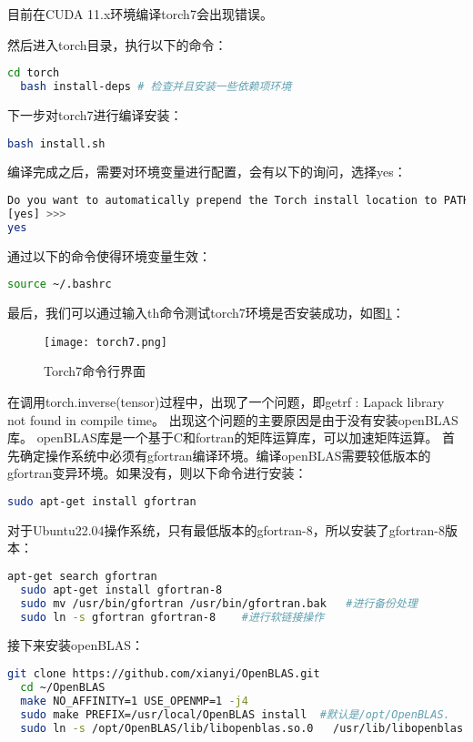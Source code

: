 \documentclass[lang=cn,a4paper,newtx]{elegantpaper}
\begin{document}
目前在CUDA 11.x环境编译torch7会出现错误。

然后进入torch目录，执行以下的命令：
\begin{lstlisting}[language=bash]
  cd torch
  bash install-deps # 检查并且安装一些依赖项环境
\end{lstlisting}

下一步对torch7进行编译安装：
\begin{lstlisting}[language=bash]
  bash install.sh
\end{lstlisting}

编译完成之后，需要对环境变量进行配置，会有以下的询问，选择yes：
\begin{lstlisting}[language=bash]
Do you want to automatically prepend the Torch install location to PATH and LD_LIBRARY in your /home/asus/.bashrc?(yes/no)
[yes] >>>
yes
\end{lstlisting}

通过以下的命令使得环境变量生效：
\begin{lstlisting}[language=bash]
  source ~/.bashrc
\end{lstlisting}

最后，我们可以通过输入th命令测试torch7环境是否安装成功，如图\ref{fig:torch7_terminal}：
\begin{figure}[hbpt]
  \centering
  \texttt{[image: torch7.png]}
  \caption{Torch7命令行界面}
  \label{fig:torch7_terminal}
\end{figure}

在调用torch.inverse(tensor)过程中，出现了一个问题，即getrf : Lapack library not found in compile time。
出现这个问题的主要原因是由于没有安装openBLAS库。
openBLAS库是一个基于C和fortran的矩阵运算库，可以加速矩阵运算。
首先确定操作系统中必须有gfortran编译环境。编译openBLAS需要较低版本的gfortran变异环境。如果没有，则以下命令进行安装：
\begin{lstlisting}[language=bash]
  sudo apt-get install gfortran
\end{lstlisting}

对于Ubuntu22.04操作系统，只有最低版本的gfortran-8，所以安装了gfortran-8版本：
\begin{lstlisting}[language=bash]
  apt-get search gfortran
  sudo apt-get install gfortran-8
  sudo mv /usr/bin/gfortran /usr/bin/gfortran.bak	#进行备份处理
  sudo ln -s gfortran gfortran-8	#进行软链接操作 
\end{lstlisting}

接下来安装openBLAS：

\begin{lstlisting}[language=bash]
  git clone https://github.com/xianyi/OpenBLAS.git
  cd ~/OpenBLAS
  make NO_AFFINITY=1 USE_OPENMP=1 -j4
  sudo make PREFIX=/usr/local/OpenBLAS install  #默认是/opt/OpenBLAS.
  sudo ln -s /opt/OpenBLAS/lib/libopenblas.so.0   /usr/lib/libopenblas.so.0
\end{lstlisting}
\end{document}
